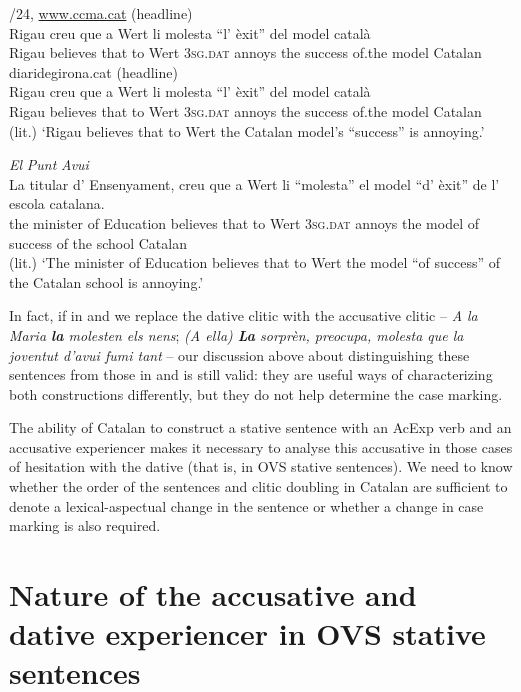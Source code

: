 \documentclass[output=paper,colorlinks,citecolor=brown,modfonts,nonflat]{langsci/langscibook}
\begin{document}
\ea%
 \label{ex:royo:7}
 /24, \url{www.ccma.cat} (headline)\\
 \gll Rigau creu que a Wert li molesta “l' èxit” del model català\\
  Rigau believes that to Wert \textsc{3sg.dat} annoys {\db}the success of.the model Catalan\\

 \ex diaridegirona.cat (headline)\\
 \gll Rigau creu que a Wert li molesta “l’ èxit” del model català\\
Rigau believes that to Wert \textsc{3sg.dat} annoys   the success of.the model Catalan \\
 \glt (lit.) ‘Rigau believes that to Wert the Catalan model’s “success” is annoying.’

 \ex \emph{El} \emph{Punt} \emph{Avui}\\
 \gll La titular d’ Ensenyament, creu que a Wert li “molesta” el model “d’ èxit” de l’ escola catalana.\\
 the minister of Education believes that to Wert \textsc{3sg.dat} {\db}annoys the model {\db}of success of the school Catalan\\
 \glt (lit.) ‘The minister of Education believes that to Wert the model “of success” of the Catalan school
is annoying.’
 \z
 \z


In fact, if in  and  we replace the dative clitic with the accusative clitic – \textit{A la Maria \textbf{la} molesten els nens}; \textit{(A ella) \textbf{La }sorprèn, preocupa, molesta que la joventut d’avui fumi tant} – our discussion above about distinguishing these sentences from those in  and  is still valid: they are useful ways of characterizing both constructions differently, but they do not help determine the case marking.

The ability of Catalan to construct a stative sentence with an AcExp verb and an accusative experiencer makes it necessary to analyse this accusative in those cases of hesitation with the dative (that is, in OVS stative sentences). We need to know whether the order of the sentences and clitic doubling in Catalan are sufficient to denote a lexical-aspectual change in the sentence or whether a change in case marking is also required.


\section{Nature of the accusative and dative experiencer in OVS stative sentences}\label{sec:royo:3}
\end{document}
